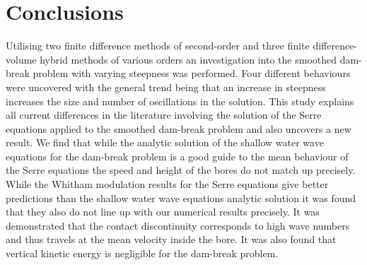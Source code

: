 \documentclass[SingleSpace,12pt,Journal]{Serre_ASCE}
\begin{document}
\section{Conclusions}
\label{section:Conclusions}
Utilising two finite difference methods of second-order and three finite difference-volume hybrid methods of various orders an investigation into the smoothed dam-break problem with varying steepness was performed. Four different behaviours were uncovered with the general trend being that an increase in steepness increases the size and number of oscillations in the solution. This study explains all current differences in the literature involving the solution of the Serre equations applied to the smoothed dam-break problem and also uncovers a new result. We find that while the analytic solution of the shallow water wave equations for the dam-break problem is a good guide to the mean behaviour of the Serre equations the speed and height of the bores do not match up precisely. While the Whitham modulation results for the Serre equations give better predictions than the shallow water wave equations analytic solution it was found that they also do not line up with our numerical results precisely. It was demonstrated that the contact discontinuity corresponds to high wave numbers and thus travels at the mean velocity inside the bore. It was also found that vertical kinetic energy is negligible for the dam-break problem. 



\end{document}
